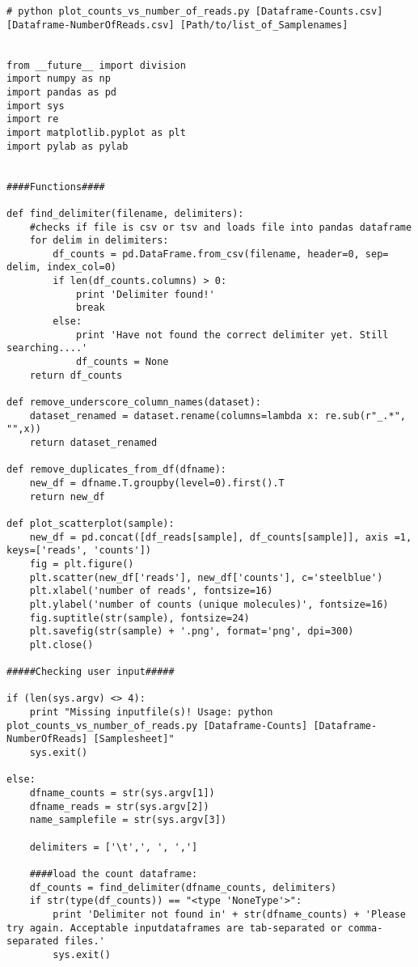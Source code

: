 \begin{footnotesize}
\begin{lstlisting}
# python plot_counts_vs_number_of_reads.py [Dataframe-Counts.csv] [Dataframe-NumberOfReads.csv] [Path/to/list_of_Samplenames]


from __future__ import division
import numpy as np
import pandas as pd
import sys
import re
import matplotlib.pyplot as plt
import pylab as pylab


####Functions####

def find_delimiter(filename, delimiters):
    #checks if file is csv or tsv and loads file into pandas dataframe
    for delim in delimiters:
        df_counts = pd.DataFrame.from_csv(filename, header=0, sep= delim, index_col=0)
        if len(df_counts.columns) > 0:
            print 'Delimiter found!'
            break
        else:
            print 'Have not found the correct delimiter yet. Still searching....'
            df_counts = None
    return df_counts

def remove_underscore_column_names(dataset):
    dataset_renamed = dataset.rename(columns=lambda x: re.sub(r"_.*", "",x))
    return dataset_renamed

def remove_duplicates_from_df(dfname):
    new_df = dfname.T.groupby(level=0).first().T
    return new_df

def plot_scatterplot(sample):
    new_df = pd.concat([df_reads[sample], df_counts[sample]], axis =1, keys=['reads', 'counts'])
    fig = plt.figure()
    plt.scatter(new_df['reads'], new_df['counts'], c='steelblue')
    plt.xlabel('number of reads', fontsize=16)
    plt.ylabel('number of counts (unique molecules)', fontsize=16)
    fig.suptitle(str(sample), fontsize=24)
    plt.savefig(str(sample) + '.png', format='png', dpi=300)
    plt.close()

#####Checking user input#####

if (len(sys.argv) <> 4):
    print "Missing inputfile(s)! Usage: python plot_counts_vs_number_of_reads.py [Dataframe-Counts] [Dataframe-NumberOfReads] [Samplesheet]"
    sys.exit()

else:
    dfname_counts = str(sys.argv[1])
    dfname_reads = str(sys.argv[2])
    name_samplefile = str(sys.argv[3])

    delimiters = ['\t',', ', ',']

    ####load the count dataframe:
    df_counts = find_delimiter(dfname_counts, delimiters)
    if str(type(df_counts)) == "<type 'NoneType'>":
        print 'Delimiter not found in' + str(dfname_counts) + 'Please try again. Acceptable inputdataframes are tab-separated or comma-separated files.'
        sys.exit()


\end{lstlisting}
\end{footnotesize}
